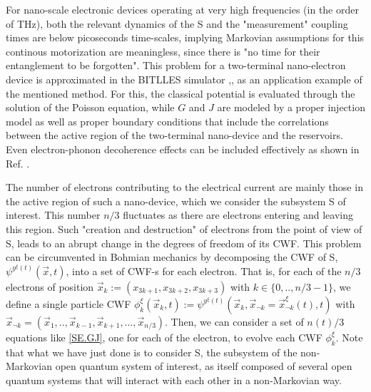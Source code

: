 \documentclass[11pt, a4paper]{article} %
\begin{document}
For nano-scale electronic devices operating at very high frequencies (in the order of THz), both the relevant dynamics of the S and the "measurement" coupling times are below picoseconds time-scales, implying Markovian assumptions for this continous motorization are meaningless, since there is "no time for their entanglement to be forgotten". This problem for a two-terminal nano-electron device is approximated in the BITLLES simulator \cite{THz},\cite{}, as an application example of the mentioned method. For this, the classical potential is evaluated through the solution of the Poisson equation\cite{}, while $G$ and $J$ are modeled by a proper injection model \cite{} as well as proper boundary conditions \cite{} that include the correlations between the active region of the two-terminal nano-device and the reservoirs. Even electron-phonon decoherence effects can be included effectively as shown in Ref. \cite{}.

The number of electrons contributing to the electrical current are mainly those in the active region of such a nano-device, which we consider the subsystem S of interest. This number $n/3$ fluctuates as there are electrons entering and leaving this region. Such "creation and destruction" of electrons from the point of view of S, leads to an abrupt change in the degrees of freedom of its CWF. This problem can be circumvented in Bohmian mechanics by decomposing the CWF of S, $\psi^{y^\xi(t)}(\vec{x},t)$, into a set of CWF-s for each electron. That is, for each of the $n/3$ electrons of position $\vec{x}_k:=(x_{3k+1}, x_{3k+2}, x_{3k+3})$ with $k\in\{0,..,n/3-1\}$, we define a single particle CWF $\phi_k^\xi(\vec{x}_k, t):=\psi^{y^\xi(t)}(\vec{x}_k, \vec{x}_{\neg k}=\vec{x}_{\neg k}^\xi(t),t)$ with $\vec{x}_{\neg k}=(\vec{x}_1,..,\vec{x}_{k-1}, \vec{x}_{k+1}, ...,\vec{x}_{n/3})$. Then, we can consider a set of $n(t)/3$ equations like \eqref{SE.GJ}, one for each of the electron, to evolve each CWF $\phi_k^\xi$. Note that what we have just done is to consider S, the subsystem of the non-Markovian open quantum system of interest, as itself composed of several open quantum systems that will interact with each other in a non-Markovian way.
\end{document}
